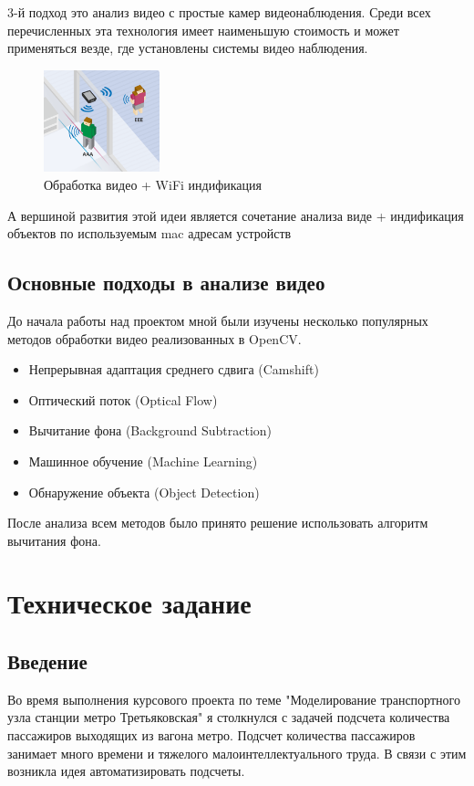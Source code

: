 \documentclass[12pt]{article}
\begin{document}
 3-й подход это анализ видео с простые камер видеонаблюдения. Среди всех перечисленных эта технология имеет наименьшую стоимость и может применяться везде, где установлены системы видео наблюдения. 

\begin{figure}[h!]
  \centering
    \includegraphics[width=0.3\textwidth]{pic/Wi-Fi_Tracking.png}
  \caption{Обработка видео + WiFi индификация}
\end{figure}

А вершиной развития этой идеи является сочетание анализа виде + индификация объектов по используемым mac адресам устройств 

		\subsection {Основные подходы в анализе видео}
			\hspace{\parindent}
До начала работы над проектом мной были изучены несколько популярных методов обработки видео реализованных  в OpenCV. 

\begin{itemize}
\item Непрерывная адаптация среднего сдвига (Camshift)
\item Оптический поток (Optical Flow)
\item Вычитание фона (Background Subtraction)
\item Машинное обучение (Machine Learning)
\item Обнаружение объекта  (Object Detection)
\end {itemize}

После анализа всем методов было принято решение использовать алгоритм вычитания фона.

\newpage

\section{Техническое задание}
	\subsection{Введение }	
Во время выполнения курсового проекта по теме "Моделирование транспортного узла станции метро Третьяковская"	 я столкнулся с задачей подсчета количества пассажиров выходящих из вагона метро. Подсчет количества пассажиров занимает много времени и тяжелого малоинтеллектуального труда. В связи с этим возникла идея автоматизировать подсчеты.  
\end{document}

